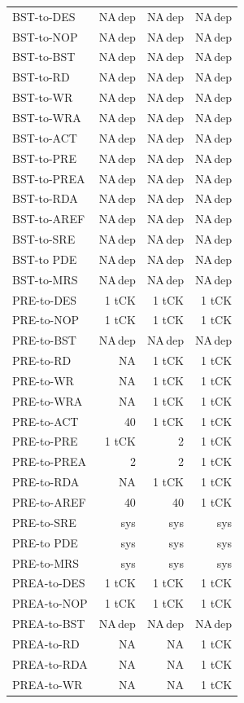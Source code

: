 {\begin{longtable}{@{}l r r r@{}}
BST-to-DES & NA\,dep & NA\,dep & NA\,dep\\
BST-to-NOP & NA\,dep & NA\,dep & NA\,dep\\
BST-to-BST & NA\,dep & NA\,dep & NA\,dep\\
BST-to-RD & NA\,dep & NA\,dep & NA\,dep\\
BST-to-WR & NA\,dep & NA\,dep & NA\,dep\\
BST-to-WRA & NA\,dep & NA\,dep & NA\,dep\\
BST-to-ACT & NA\,dep & NA\,dep & NA\,dep\\
BST-to-PRE & NA\,dep & NA\,dep & NA\,dep\\
BST-to-PREA & NA\,dep & NA\,dep & NA\,dep\\
BST-to-RDA & NA\,dep & NA\,dep & NA\,dep\\
BST-to-AREF & NA\,dep & NA\,dep & NA\,dep\\
BST-to-SRE & NA\,dep & NA\,dep & NA\,dep\\
BST-to PDE & NA\,dep & NA\,dep & NA\,dep\\
BST-to-MRS & NA\,dep & NA\,dep & NA\,dep\\
PRE-to-DES & 1 tCK & 1 tCK & 1 tCK\\
PRE-to-NOP & 1 tCK & 1 tCK & 1 tCK\\
PRE-to-BST & NA\,dep & NA\,dep & NA\,dep\\
PRE-to-RD & NA & 1 tCK & 1 tCK\\
PRE-to-WR & NA & 1 tCK & 1 tCK\\
PRE-to-WRA & NA & 1 tCK & 1 tCK\\
PRE-to-ACT & 40 & 1 tCK & 1 tCK\\
PRE-to-PRE & 1 tCK & 2 & 1 tCK\\
PRE-to-PREA & 2 & 2 & 1 tCK\\
PRE-to-RDA & NA & 1 tCK & 1 tCK\\
PRE-to-AREF & 40 & 40 & 1 tCK\\
PRE-to-SRE & sys & sys & sys\\
PRE-to PDE & sys & sys & sys\\
PRE-to-MRS & sys & sys & sys\\
PREA-to-DES & 1 tCK & 1 tCK & 1 tCK\\
PREA-to-NOP & 1 tCK & 1 tCK & 1 tCK\\
PREA-to-BST & NA\,dep & NA\,dep & NA\,dep\\
PREA-to-RD & NA & NA & 1 tCK\\
PREA-to-RDA & NA & NA & 1 tCK\\
PREA-to-WR & NA & NA & 1 tCK\\

\end{longtable}}
